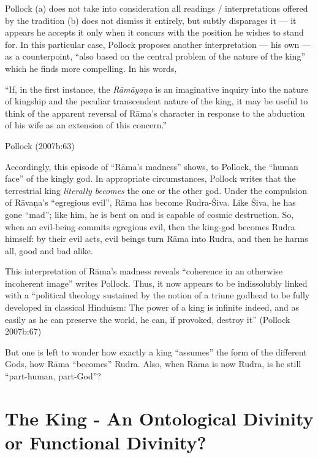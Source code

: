 Pollock (a) does not take into consideration all readings / interpretations offered by the tradition (b) does not dismiss it entirely, but subtly disparages it --- it appears he accepts it only when it concurs with the position he wishes to stand for. In this particular case, Pollock proposes another interpretation --- his own --- as a counterpoint, “also based on the central problem of the nature of the king” which he finds more compelling. In his words, 

\begin{myquote}
“If, in the first instance, the {\sl Rāmāyaṇa} is an imaginative inquiry into the nature of kingship and the peculiar transcendent nature of the king, it may be useful to think of the apparent reversal of Rāma’s character in response to the abduction of his wife as an extension of this concern.”

\hfill Pollock (2007b:63)
\end{myquote}

Accordingly, this episode of “Rāma’s madness” shows, to Pollock, the “human face” of the kingly god.  In appropriate circumstances, Pollock writes that the terrestrial king {\sl literally becomes} the one or the other god. Under the compulsion of Rāvaṇa’s “egregious evil”, Rāma has become Rudra-Śiva. Like Śiva, he has gone “mad”; like him, he is bent on and is capable of cosmic destruction. So, when an evil-being commits egregious evil, then the king-god becomes Rudra himself: by their evil acts, evil beings turn Rāma into Rudra, and then he harms all, good and bad alike. 

This interpretation of Rāma’s madness reveals “coherence in an otherwise incoherent image” writes Pollock. Thus, it now appears to be indissolubly linked with a “political theology sustained by the notion of a triune godhead to be fully developed in classical Hinduism: The power of a king is infinite indeed, and as easily as he can preserve the world, he can, if provoked, destroy it” (Pollock 2007b:67) 

But one is left to wonder how exactly a king “assumes” the form of the different Gods, how Rāma “becomes” Rudra. Also, when Rāma is now Rudra, is he still “part-human, part-God”? \\[-25pt]

\section[The King - An Ontological Divinity or\hfil\break Functional Divinity?]{The King - An Ontological Divinity or Functional Divinity?}\label{sec2.5}

